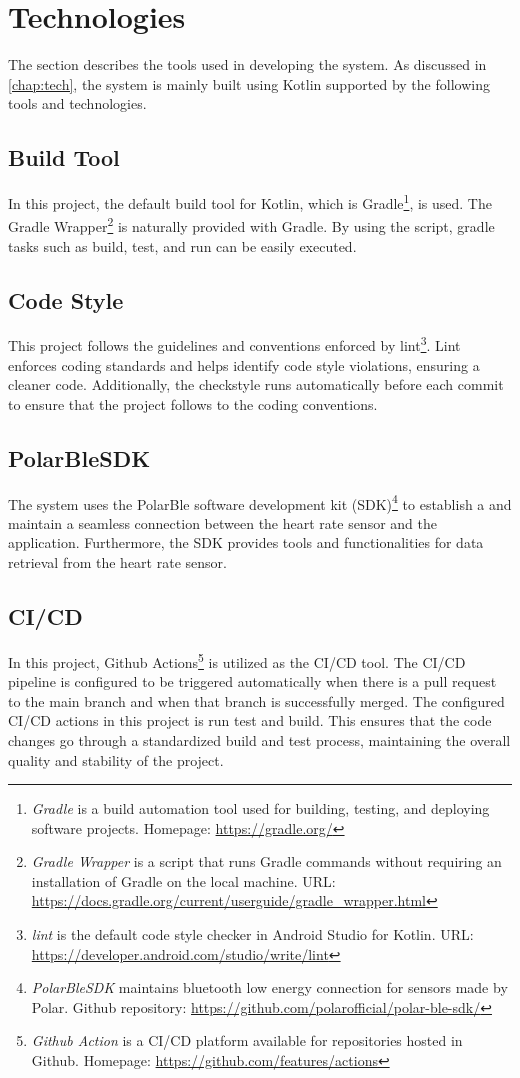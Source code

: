\section{Technologies}
The section describes the tools used in developing the system. 
As discussed in \autoref{chap:tech}, the system is mainly built using Kotlin supported by the following tools and technologies.

\subsection{Build Tool}
In this project, the default build tool for Kotlin, which is Gradle\footnote{\emph{Gradle} is a build automation tool used for  building, testing, and deploying software projects. Homepage: \url{https://gradle.org/}}, is used.
The Gradle Wrapper\footnote{\emph{Gradle Wrapper} is a script that runs Gradle commands without requiring an installation of Gradle on the local machine. URL: \url{https://docs.gradle.org/current/userguide/gradle_wrapper.html}} is naturally provided with Gradle. 
By using the script, gradle tasks such as build, test, and run can be easily executed.

\subsection{Code Style}
This project follows the guidelines and conventions enforced by lint\footnote{\emph{lint} is the default code style checker in Android Studio for Kotlin. URL: \url{https://developer.android.com/studio/write/lint}}.
Lint enforces coding standards and helps identify code style violations, ensuring a cleaner code. 
Additionally, the checkstyle runs automatically before each commit to ensure that the project follows to the coding conventions.

\subsection{PolarBleSDK}
The system uses the PolarBle software development kit (SDK)\footnote{\emph{PolarBleSDK} maintains bluetooth low energy connection for sensors made by Polar. Github repository: \url{https://github.com/polarofficial/polar-ble-sdk/}} to establish a and maintain a seamless connection between the heart rate sensor and the application.
Furthermore, the SDK provides tools and functionalities for data retrieval from the heart rate sensor.

\subsection{CI/CD}
In this project, Github Actions\footnote{\emph{Github Action} is a CI/CD platform available for repositories hosted in Github. Homepage: \url{https://github.com/features/actions}} is utilized as the CI/CD tool. 
The CI/CD pipeline is configured to be triggered automatically when there is a pull request to the main branch and when that branch is successfully merged. The configured CI/CD actions in this project is run test and build. 
This ensures that the code changes go through a standardized build and test process, maintaining the overall quality and stability of the project.

